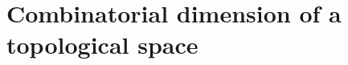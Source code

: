 \section{Combinatorial dimension of a topological space}
\label{section:combinatorial-dimension-of-a-topological-space}
